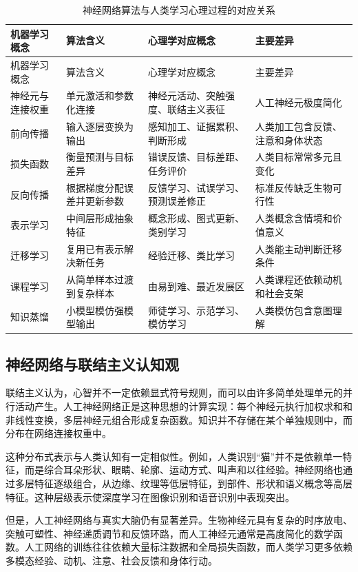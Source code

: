 \documentclass[UTF8,zihao=-4,a4paper]{ctexart}
\begin{document}
\begin{longtable}{p{3.0cm}p{4.2cm}p{4.2cm}p{2.8cm}}
\caption{神经网络算法与人类学习心理过程的对应关系}
\label{tab:nn_psychology_mapping}\\
\toprule
机器学习概念 & 算法含义 & 心理学对应概念 & 主要差异 \\
\midrule
\endfirsthead
\toprule
机器学习概念 & 算法含义 & 心理学对应概念 & 主要差异 \\
\midrule
\endhead
神经元与连接权重 & 单元激活和参数化连接 & 神经元活动、突触强度、联结主义表征 & 人工神经元极度简化 \\
前向传播 & 输入逐层变换为输出 & 感知加工、证据累积、判断形成 & 人类加工包含反馈、注意和身体状态 \\
损失函数 & 衡量预测与目标差异 & 错误反馈、目标差距、任务评价 & 人类目标常常多元且变化 \\
反向传播 & 根据梯度分配误差并更新参数 & 反馈学习、试误学习、预测误差修正 & 标准反传缺乏生物可行性 \\
表示学习 & 中间层形成抽象特征 & 概念形成、图式更新、类别学习 & 人类概念含情境和价值意义 \\
迁移学习 & 复用已有表示解决新任务 & 经验迁移、类比学习 & 人类能主动判断迁移条件 \\
课程学习 & 从简单样本过渡到复杂样本 & 由易到难、最近发展区 & 人类课程还依赖动机和社会支架 \\
知识蒸馏 & 小模型模仿强模型输出 & 师徒学习、示范学习、模仿学习 & 人类模仿包含意图理解 \\
\bottomrule
\end{longtable}

\subsection{神经网络与联结主义认知观}

联结主义认为，心智并不一定依赖显式符号规则，而可以由许多简单处理单元的并行活动产生。人工神经网络正是这种思想的计算实现：每个神经元执行加权求和和非线性变换，多层神经元组合形成复杂函数。知识并不存储在某个单独规则中，而分布在网络连接权重中。

这种分布式表示与人类认知有一定相似性。例如，人类识别“猫”并不是依赖单一特征，而是综合耳朵形状、眼睛、轮廓、运动方式、叫声和以往经验。神经网络也通过多层特征逐级组合，从边缘、纹理等低层特征，到部件、形状和语义概念等高层特征。这种层级表示使深度学习在图像识别和语音识别中表现突出。

但是，人工神经网络与真实大脑仍有显著差异。生物神经元具有复杂的时序放电、突触可塑性、神经递质调节和反馈环路，而人工神经元通常是高度简化的数学函数。人工网络的训练往往依赖大量标注数据和全局损失函数，而人类学习更多依赖多模态经验、动机、注意、社会反馈和身体行动。
\end{document}
